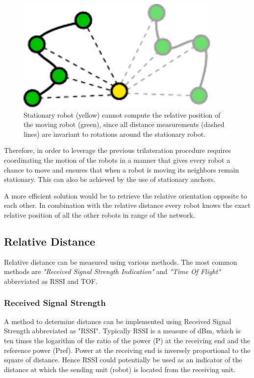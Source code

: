 \documentclass[10pt,a4paper]{article}
\begin{document}
\begin{figure}[H]
\centering
\includegraphics[width=0.9\textwidth]{drolletje.pdf}
\caption{Stationary robot (yellow) cannot compute the relative position of the moving robot (green), since all distance measurements (dashed lines) are invariant to rotations around the stationary robot.\cite{Angle}}
\label{Angle}
\end{figure}

Therefore, in order to leverage the previous trilateration procedure requires coordinating the motion of the robots in a manner that gives every robot a chance to move and ensures that when a robot is moving its neighbors remain stationary. This can also be achieved by the use of stationary anchors.\cite{Angle}

A more efficient solution would be to retrieve the relative orientation opposite to each other. In combination with the relative distance every robot knows the exact relative position of all the other robots in range of the network.
\newpage

\subsection{Relative Distance}
Relative distance can be measured using various methods. The most common methods are \textit{"Received Signal Strength Indication"} and \textit{"Time Of Flight"} abbreviated as RSSI and TOF. 

\subsubsection{Received Signal Strength}
A method to determine distance can be implemented using Received Signal Strength abbreviated as "RSSI". Typically RSSI is a measure of dBm, which is ten times the logarithm of the ratio of the power (P)
at the receiving end and the reference power (Pref). Power at the receiving end is inversely proportional to the
square of distance.\cite{RSSI} Hence RSSI could potentially be used as an indicator of the distance
at which the sending unit (robot) is located from the receiving unit.\cite{RSSI}
\end{document}
